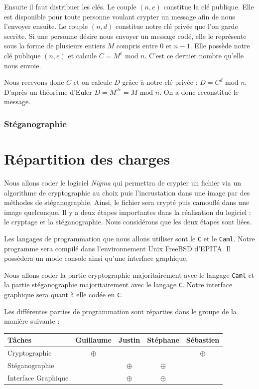 \documentclass[a4paper,12pt]{article}
\begin{document}
Ensuite il faut distribuer les clés. Le couple $(n, e)$ constitue la clé publique. Elle est disponible pour toute personne voulant crypter un message afin de nous l'envoyer ensuite. Le couple $(n, d)$ constitue notre clé privée que l'on garde secrète. Si une personne désire nous envoyer un message codé, elle le représente sous la forme de plusieurs entiers $M$ compris entre 0 et $n - 1$. Elle possède notre clé publique $(n, e)$ et calcule $C = M^{e} \textrm{ mod } n$. C'est ce dernier nombre qu'elle nous envoie.

Nous recevons donc $C$ et on calcule $D$ grâce à notre clé privée : $D = C^{d} \textrm{ mod } n$. D'après un théorème d'Euler $D = M^{de} = M \textrm{ mod } n$. On a donc reconstitué le message.

\section{Stéganographie}

\newpage

\part{Répartition des charges}
Nous allons coder le logiciel \emph{Nigma} qui permettra de crypter un fichier via un algorithme de cryptographie au choix puis l'incrustation dans une image par des méthodes de stéganographie. Ainsi, le fichier sera crypté puis camouflé dans une image quelconque. Il y a deux étapes importantes dans la réalisation du logiciel : le cryptage et la stéganographie. Nous considérons que les deux étapes sont liées.

Les langages de programmation que nous allons utiliser sont le \texttt{C} et le \texttt{Caml}. Notre programme sera compilé dans l'environnement Unix FreeBSD d'EPITA. Il possèdera un mode console ainsi qu'une interface graphique.

Nous allons coder la partie cryptographie majoritairement avec le langage \texttt{Caml} et la partie stéganographie majoritairement avec le langage \texttt{C}. Notre interface graphique sera quant à elle codée en \texttt{C}.

Les différentes parties de programmation sont réparties dans le groupe de la manière suivante :

\bigskip

\begin{tabular}{|l|c|c|c|c|}
  \hline
  Tâches              & Guillaume & Justin   & Stéphane & Sébastien \\ \hline \hline
  Cryptographie       & $\oplus$  &          &          & $\oplus$  \\ \hline
  Stéganographie      &           & $\oplus$ & $\oplus$ &           \\ \hline
  Interface Graphique &           & $\oplus$ & $\oplus$ &           \\ \hline
\end{tabular}
\end{document}
